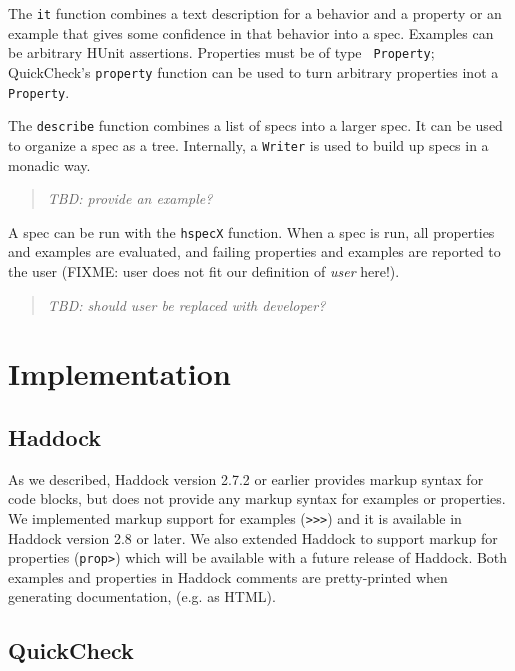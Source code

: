 \documentclass[preprint]{sigplanconf}
\begin{document}
\noindent The {\tt it} function combines a text description for a behavior and
a property or an example that gives some confidence in that behavior into a
spec.
Examples can be arbitrary HUnit assertions.  Properties must be of type {\tt
Property}; QuickCheck's \texttt{property} function can be used to turn
arbitrary properties inot a \texttt{Property}.

The \texttt{describe} function combines a list of specs into a larger spec.  It
can be used to organize a spec as a tree.
Internally, a \texttt{Writer} is used to build up specs in a monadic way.

\begin{quote}
    \emph{TBD: provide an example?}
\end{quote}

A spec can be run with the \texttt{hspecX} function.  When a spec is run, all
properties and examples are evaluated, and failing properties and examples are
reported to the user (FIXME: user does not fit our definition of \emph{user}
here!).

\begin{quote}
    \emph{TBD: should user be replaced with developer?}
\end{quote}


\section{Implementation}

\subsection{Haddock}

As we described, Haddock version 2.7.2 or earlier provides markup syntax for
code blocks, but does not provide any markup syntax for examples or properties.
We implemented markup support for examples ({\tt >>>}) and it is available in
Haddock version 2.8 or later.
We also extended Haddock to support markup for properties ({\tt prop>}) which
will be available with a future release of Haddock.
Both examples and properties in Haddock comments are pretty-printed when
generating documentation, (e.g. as HTML).

\subsection{QuickCheck}
\end{document}
